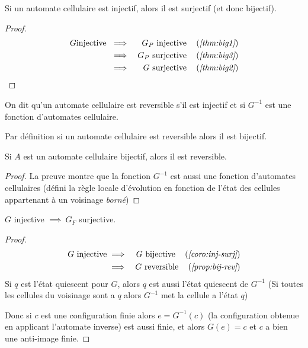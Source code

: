 \begin{coro} \label{coro:inj-surj}
	Si un automate cellulaire est injectif, alors il est surjectif (et donc bijectif).
\end{coro}

\begin{proof}
	\begin{eqnarray*}
		G \text{injective } &\implies& G_P \text{ injective} \quad\left(\textit{\ref{thm:big1}}\right) \\
		&\implies& G_P \text{ surjective} \quad\left(\textit{\ref{thm:big3}}\right) \\
		&\implies& G \text{ surjective} \quad\left(\textit{\ref{thm:big2}}\right)
	\end{eqnarray*}
\end{proof}


\begin{definition}
	On dit qu'un automate cellulaire est reversible s'il est injectif et si $G^{-1}$ est une fonction d'automates cellulaire.
\end{definition}

\begin{remarque}
	Par définition si un automate cellulaire est reversible alors il est bijectif.
\end{remarque}

\begin{prop}\label{prop:bij-rev}
	Si $A$ est un automate cellulaire bijectif, alors il est reversible.
\end{prop}

\begin{proof}
	La preuve montre que la fonction $G^{-1}$ est aussi une fonction d'automates cellulaires
	(défini la règle locale d'évolution en fonction de l'état des cellules appartenant à un voisinage \emph{borné})
\end{proof}

\begin{coro}
	$G$ injective $\implies \ G_F$ surjective.
\end{coro}


\begin{proof}
	\begin{eqnarray*}
		G \text{ injective} &\implies& G \text{ bijective} \quad\left(\textit{\ref{coro:inj-surj}}\right)\\
		&\implies& G \text{ reversible} \quad\left(\textit{\ref{prop:bij-rev}}\right)
	\end{eqnarray*}
	Si $q$ est l'état quiescent pour $G$, alors $q$ est aussi l'état quiescent de $G^{-1}$
	(Si toutes les cellules du voisinage sont a $q$ alors $G^{-1}$ met la cellule a l'état $q$)

	Donc si $c$ est une configuration finie alors $e = G^{-1}(c)$ (la configuration obtenue en applicant
	l'automate inverse) est aussi finie, et alors $G(e) = c$ et $c$ a bien une anti-image finie.
\end{proof}

